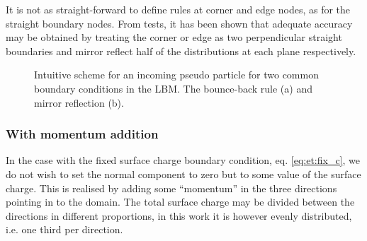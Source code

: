 It is not as straight-forward to define rules at corner and edge
nodes, as for the straight boundary nodes. From tests, it has been
shown that adequate accuracy may be obtained by treating the corner or
edge as two perpendicular straight boundaries and mirror reflect half
of the distributions at each plane respectively. 

\begin{figure}
  \centering
  \hspace{5pt} 
  \caption[Intuitive scheme for the bounce-back and mirror reflection
    conditions.]{Intuitive scheme for an incoming pseudo particle for
    two common boundary conditions in the LBM. The bounce-back rule
    (a) and mirror reflection (b).}
  \label{fig:lbm:bbs}
\end{figure}

\subsubsection{With momentum addition}\label{sec:lbm:mod_mirror}
In the case with the fixed surface charge boundary condition,
eq. \eqref{eq:et:fix_c}, we do not wish to set the normal component to
zero but to some value of the surface charge. This is realised by
adding some ``momentum'' in the three directions pointing in to the
domain. The total surface charge may be divided between the directions
in different proportions, in this work it is however evenly
distributed, i.e. one third per direction. 


